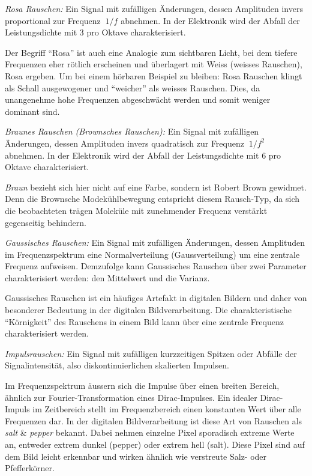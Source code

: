 \begin{definition}
	{\em Rosa Rauschen:}
	Ein Signal mit zufälligen Änderungen, dessen Amplituden invers proportional zur Frequenz $ ~1/f $  abnehmen. In der Elektronik wird der Abfall der Leistungsdichte mit 3  pro Oktave charakterisiert.
\end{definition}

 Der Begriff ``Rosa'' ist auch eine Analogie zum sichtbaren Licht, bei dem tiefere Frequenzen eher rötlich erscheinen und überlagert mit Weiss (weisses Rauschen), Rosa ergeben. Um bei einem hörbaren Beispiel zu bleiben: Rosa Rauschen klingt als Schall ausgewogener und ``weicher'' als weisses Rauschen. Dies, da unangenehme hohe Frequenzen abgeschwächt werden und somit weniger dominant sind.

\begin{definition}
	{\em Braunes Rauschen (Brownsches Rauschen):}
	Ein Signal mit zufälligen Änderungen, dessen Amplituden invers quadratisch zur Frequenz $ ~1/f^2 $ abnehmen. In der Elektronik wird der Abfall der Leistungsdichte mit 6  pro Oktave charakterisiert.
\end{definition}

\textit{Braun} bezieht sich hier nicht auf eine Farbe, sondern ist Robert Brown gewidmet. Denn die Brownsche Modekühlbewegung entspricht diesem Rausch-Typ, da sich die beobachteten trägen Moleküle mit zunehmender Frequenz verstärkt gegenseitig behindern.

\begin{definition}
	{\em Gaussisches Rauschen:}
	Ein Signal mit zufälligen Änderungen, dessen Amplituden im Frequenzspektrum eine Normalverteilung (Gaussverteilung) um eine zentrale Frequenz aufweisen. Demzufolge kann Gaussisches Rauschen über zwei Parameter charakterisiert werden: den Mittelwert und die Varianz.
\end{definition}

Gaussisches Rauschen ist ein häufiges Artefakt in digitalen Bildern und daher von besonderer Bedeutung in der digitalen Bildverarbeitung. Die charakteristische ``Körnigkeit'' des Rauschens in einem Bild kann über eine zentrale Frequenz charakterisiert werden.

\begin{definition}
	{\em Impulsrauschen:}
	Ein Signal mit zufälligen kurzzeitigen Spitzen oder Abfälle der Signalintensität, also diskontinuierlichen skalierten Impulsen. 
\end{definition}

Im Frequenzspektrum äussern sich die Impulse über einen breiten Bereich, ähnlich zur Fourier-Transformation eines Dirac-Impulses. Ein idealer Dirac-Impuls im Zeitbereich stellt im Frequenzbereich einen konstanten Wert über alle Frequenzen dar.
In der digitalen Bildverarbeitung ist diese Art von Rauschen als \textit{salt} \& \textit{pepper} bekannt. Dabei nehmen einzelne Pixel sporadisch extreme Werte an, entweder extrem dunkel (pepper) oder extrem hell (salt). Diese Pixel sind auf dem Bild leicht erkennbar und wirken ähnlich wie verstreute Salz- oder Pfefferkörner.


